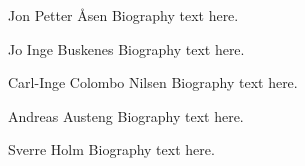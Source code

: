 \documentclass[12pt,journal,onecolumn]{IEEEtran}
\begin{document}

\begin{IEEEbiography}{Jon Petter \AA{}sen}
Biography text here.
\end{IEEEbiography}

\begin{IEEEbiography}{Jo Inge Buskenes}
Biography text here.
\end{IEEEbiography}

\begin{IEEEbiography}{Carl-Inge Colombo Nilsen}
Biography text here.
\end{IEEEbiography}


\begin{IEEEbiography}{Andreas Austeng}
Biography text here.
\end{IEEEbiography}

\begin{IEEEbiography}{Sverre Holm}
Biography text here.
\end{IEEEbiography}







\end{document}
